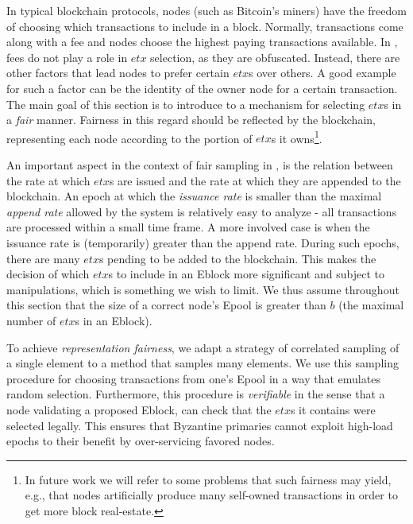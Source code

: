 In typical blockchain protocols, nodes (such as Bitcoin's miners) have the freedom of choosing which transactions to include in a block. Normally, transactions come along with a fee and nodes choose the highest paying transactions available. In \nameNS, fees do not play a role in $etx$ selection, as they are obfuscated. Instead, there are other factors that lead nodes to prefer certain $etx$s over others. A good example for such a factor can be the identity of the owner node for a certain transaction. The main goal of this section is to introduce to \name a mechanism for selecting $etx$s in a \emph{fair} manner. Fairness in this regard should be reflected by the blockchain, representing each node according to the portion of $etx$s it owns\footnote{In future work we will refer to some problems that such fairness may yield, e.g., that nodes artificially produce many self-owned transactions in order to get more block real-estate.}. %

An important aspect in the context of fair sampling in \nameNS, is the relation between the rate at which $etx$s are issued and the rate at which they are appended to the blockchain. An epoch at which the \emph{issuance rate} is smaller than the maximal \emph{append rate} allowed by the system  is relatively easy to analyze - all transactions are processed within a small time frame. A more involved case is when the issuance rate is (temporarily) greater than the append rate. During such epochs, there are many $etx$s pending to be added to the blockchain. This makes the decision of which $etx$s to include in an Eblock more significant and subject to manipulations, which is something we wish to limit. We thus assume throughout this section that the size of a correct node's Epool is greater than $b$ (the maximal number of $etx$s in an Eblock). %

To achieve \emph{representation fairness}, we adapt a strategy of correlated sampling of a single element to a method that samples many elements. We use this sampling procedure for choosing transactions from one's Epool in a way that emulates random selection. Furthermore, this procedure is \emph{verifiable} in the sense that a node validating a proposed Eblock, can check that the $etx$s it contains were selected legally. This ensures that Byzantine primaries cannot exploit high-load epochs to their benefit by over-servicing favored nodes.

